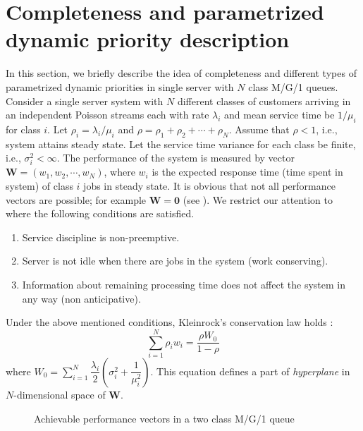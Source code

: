 \documentclass[letterpaper, 10 pt, conference]{ieeeconf}  %
\begin{document}
\section{Completeness and parametrized dynamic priority description}
\label{sec:description}
In this section, we briefly describe the idea of completeness and different types of parametrized dynamic priorities in single server with $N$ class M/G/1 queues.\\
\indent Consider a single server system with $N$ different classes of customers arriving in an independent Poisson streams each with rate $\lambda_i$ and mean service time be $1/\mu_i$ for class $i$. Let $\rho_i = \lambda_i/\mu_i$ and $\rho = \rho_1 + \rho_2 +\cdots +\rho_N$. Assume that $\rho < 1$, i.e., system attains steady state. Let the service time variance for each class be finite, i.e., $\sigma_i^2< \infty$. The performance of the system is measured by vector $\mathbf{W} = (w_1, w_2, \cdots, w_N)$, where $w_i$ is the expected response time (time spent in system) of class $i$ jobs in steady state. It is obvious that not all performance vectors are possible; for example $\mathbf{W =0}$ (see \cite{complete}). We restrict our attention to where the following conditions are satisfied.
\begin{enumerate}
\item Service discipline is non-preemptive.
\item Server is not idle when there are jobs in the system (work conserving). 
\item Information about remaining processing time does not affect the system in any way (non anticipative).
\end{enumerate}
Under the above mentioned conditions, Kleinrock's conservation law holds \cite{Kleinrock1965}:
\begin{equation}
\sum_{i=1}^N\rho_i w_i = \dfrac{\rho W_0}{1-\rho}
\end{equation} 
where $W_0 = \sum_{i=1}^N\dfrac{\lambda_i}{2}\left(\sigma_i^2 + \dfrac{1}{\mu_i^2}\right)$. This equation defines a part of \textit{hyperplane} in $N$-dimensional space of $\mathbf{W}$. 
\begin{figure}[htb!]
\centering
\resizebox{0.35 \textwidth}{!}{}
\caption{Achievable performance vectors in a two class M/G/1 queue \cite{mitranibook}}
\label{2classline}
\end{figure}
\end{document}
